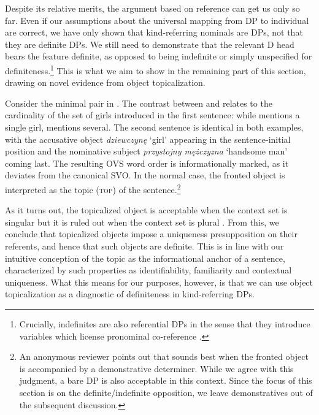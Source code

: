 \documentclass[output=paper]{langscibook}
\begin{document}
 \label{ex:bookshelf_2}
\z \z

\noindent
Despite its relative merits, the argument based on reference can get us only so far. Even if our assumptions about the universal mapping from DP to individual are correct, we have only shown that kind-referring nominals are DPs, not that they are definite DPs. We still need to demonstrate that the relevant D head bears the feature definite, as opposed to being indefinite or simply unspecified for definiteness.\footnote{Crucially, indefinites are also referential DPs in the sense that they introduce variables which license pronominal co-reference \citep{Heim1982, Kamp.Reyle1993}.} This is what we aim to show in the remaining part of this section, drawing on novel evidence from object topicalization.

Consider the minimal pair in . The contrast between  and  relates to the cardinality of the set of girls introduced in the first sentence: while  mentions a single girl,  mentions several. The second sentence is identical in both examples, with the accusative object \textit{dziewczynę} `girl' appearing in the sentence-initial position and the nominative subject \textit{przystojny mężczyzna} `handsome man' coming last. The resulting OVS word order is informationally marked, as it deviates from the canonical  SVO. In the normal case, the fronted object is interpreted as the topic (\textsc{top}) of the sentence.\footnote{An anonymous reviewer points out that  sounds best when the fronted object is accompanied by a demonstrative determiner. While we agree with this judgment, a bare DP is also acceptable in this context. Since the focus of this section is on the definite\slash indefinite opposition, we leave demonstratives out of the subsequent discussion.}

As it turns out, the topicalized object is acceptable when the context set is singular  but it is ruled out when the context set is plural . From this, we conclude that topicalized objects impose a uniqueness presupposition on their referents, and hence that such objects are definite. This is in line with our intuitive conception of the topic as the informational anchor of a sentence, characterized by such properties as identifiability, familiarity and contextual uniqueness. What this means for our purposes, however, is that we can use object topicalization as a diagnostic of definiteness in kind-referring DPs.\largerpage[-1]
\end{document}
